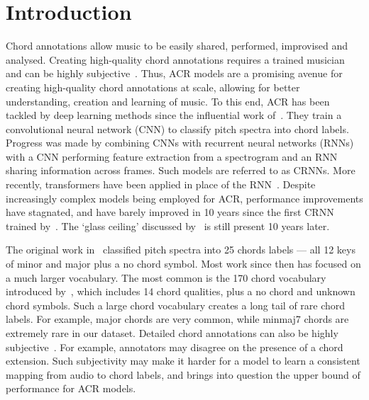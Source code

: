 \section{Introduction}\label{sec:introduction}

Chord annotations allow music to be easily shared, performed, improvised and analysed. Creating high-quality chord annotations requires a trained musician and can be highly subjective~\cite{annotatorsubjectivity}. Thus, ACR models are a promising avenue for creating high-quality chord annotations at scale, allowing for better understanding, creation and learning of music. To this end, ACR has been tackled by deep learning methods since the influential work of~\cite{RethinkingChordRecognition}. They train a convolutional neural network (CNN) to classify pitch spectra into chord labels. Progress was made by combining CNNs with recurrent neural networks (RNNs)~\cite{firstrnn, ACRCNNRNN1,ACRLargeVocab1,StructuredTraining} with a CNN performing feature extraction from a spectrogram and an RNN sharing information across frames. Such models are referred to as CRNNs. More recently, transformers have been applied in place of the RNN~\cite{MelodyTranscriptionViaGenerativePreTraining, HarmonyTransformer, AttendToChords,CurriculumLearning,BTC,discordharmony,chordformer}. Despite increasingly complex models being employed for ACR, performance improvements have stagnated, and have barely improved in 10 years since the first CRNN trained by~\cite{firstrnn}. The `glass ceiling' discussed by~\cite{FourTimelyInsights} is still present 10 years later.


The original work in~\cite{RethinkingChordRecognition} classified pitch spectra into 25 chords labels — all 12 keys of minor and major plus a no chord symbol. Most work since then has focused on a much larger vocabulary. The most common is the 170 chord vocabulary introduced by~\cite{StructuredTraining}, which includes 14 chord qualities, plus a no chord and unknown chord symbols. Such a large chord vocabulary creates a long tail of rare chord labels. For example, major chords are very common, while minmaj7 chords are extremely rare in our dataset. Detailed chord annotations can also be highly subjective~\cite{annotatorsubjectivity}. For example, annotators may disagree on the presence of a chord extension. Such subjectivity may make it harder for a model to learn a consistent mapping from audio to chord labels, and brings into question the upper bound of performance for ACR models.

